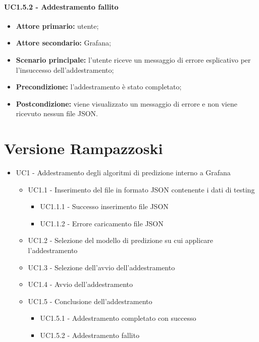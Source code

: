\documentclass{article}
\begin{document}
	\paragraph{UC1.5.2 - Addestramento fallito}
	\begin{itemize}
		\item \textbf{Attore primario:} utente;
		\item \textbf{Attore secondario:} Grafana;
		\item \textbf{Scenario principale:} l'utente riceve un messaggio di errore esplicativo per l'insuccesso dell'addestramento;
		\item \textbf{Precondizione:} l'addestramento è stato completato;
		\item \textbf{Postcondizione:} viene visualizzato un messaggio di errore e non viene ricevuto nessun file JSON.
	\end{itemize}

\section{Versione Rampazzoski}
	\begin{itemize}
		\item UC1 - Addestramento degli algoritmi di predizione interno a Grafana
		\begin{itemize}
			\item UC1.1 - Inserimento del file in formato JSON contenente i dati di testing
			\begin{itemize}
				\item UC1.1.1 - Successo inserimento file JSON
				\item UC1.1.2 - Errore caricamento file JSON
			\end{itemize}
			\item UC1.2 - Selezione del modello di predizione su cui applicare l'addestramento
			\item UC1.3 - Selezione dell'avvio dell'addestramento
			\item UC1.4 - Avvio dell'addestramento
			\item UC1.5 - Conclusione dell'addestramento
			\begin{itemize}
				\item UC1.5.1 - Addestramento completato con successo
				\item UC1.5.2 - Addestramento fallito
			\end{itemize}
		\end{itemize}
		
	\end{itemize}
\end{document}
